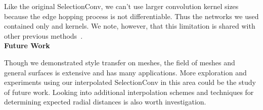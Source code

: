 \documentclass[10pt,twocolumn,letterpaper]{article}
\begin{document}
Like the original SelectionConv, we can't use larger convolution kernel sizes because the edge hopping process is not differentiable. Thus the networks we used contained only  and  kernels. We note, however, that this limitation is shared with other previous methods~\cite{Chiyu2019, Zhang2019}. \\

\noindent \textbf{Future Work}

Though we demonstrated style transfer on meshes, the field of meshes and general surfaces is extensive and has many applications. More exploration and experiments using our interpolated SelectionConv in this area could be the study of future work. Looking into additional interpolation schemes and techniques for determining expected radial distances is also worth investigation.
\end{document}
